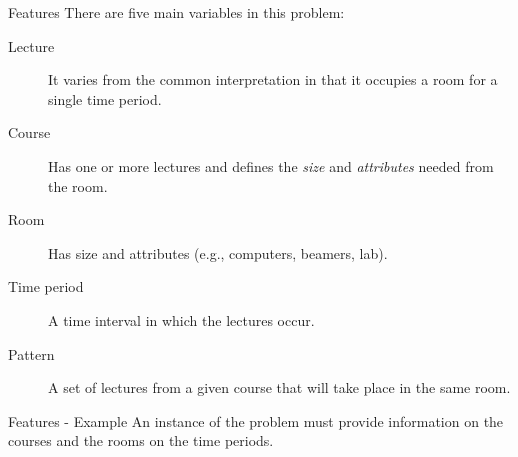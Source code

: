 \documentclass{beamer}
\begin{document}
\begin{frame}{Features}
    There are five main variables in this problem:
\begin{description}
    \item[Lecture] It varies from the common interpretation in that it occupies a room for a single time period.
    \item[Course] Has one or more lectures and defines the \emph{size} and \emph{attributes} needed from the room.
    \item[Room] Has size and attributes (e.g., computers, beamers, lab).
    \item[Time period] A time interval in which the lectures occur.
    \item[Pattern] A set of lectures from a given course that will take place in the same room.
\end{description}
\end{frame}

\begin{frame}{Features - Example}
    An instance of the problem must provide information on the courses and the rooms on the time periods.
    \begin{table}[H]
        \centering
    \end{table}

    \begin{table}[H]
        \centering
    \end{table}
\end{frame}
\end{document}
